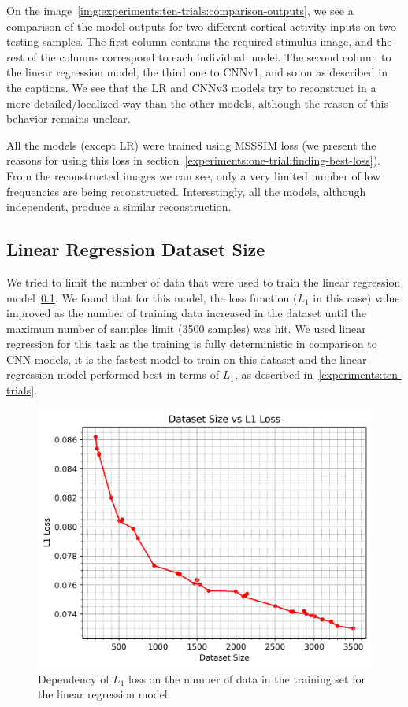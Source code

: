 On the image~\ref{img:experiments:ten-trials:comparison-outputs}, we see a comparison of the model outputs for two different cortical activity inputs on two testing samples. The first column contains the required stimulus image, and the rest of the columns correspond to each individual model. The second column to the linear regression model, the third one to CNNv1, and so on as described in the captions. We see that the LR and CNNv3 models try to reconstruct in a more detailed/localized way than the other models, although the reason of this behavior remains unclear.

All the models (except LR) were trained using MSSSIM loss (we present the reasons for using this loss in section~\ref{experiments:one-trial:finding-best-loss}). From the reconstructed images we can see, only a very limited number of low frequencies are being reconstructed. Interestingly, all the models, although independent, produce a similar reconstruction.


\subsection{Linear Regression Dataset Size}
\label{experiments:ten-trials:linear-regression}
We tried to limit the number of data that were used to train the linear regression model~\ref{experiments:ten-trials:linear-regression}. We found that for this model, the loss function ($L_1$ in this case) value improved as the number of training data increased in the dataset until the maximum number of samples limit (3500 samples) was hit. We used linear regression for this task as the training is fully deterministic in comparison to CNN models, it is the fastest model to train on this dataset and the linear regression model performed best in terms of $L_1$, as described in~\ref{experiments:ten-trials}.

\begin{figure}[H]\centering
\includegraphics[width=140mm]{img/ten-trials/linear_regression_ten_trials.png}
\caption{Dependency of $L_1$ loss on the number of data in the training set for the linear regression model.}
\label{img:experiments:ten-trials:linear-regression}
\end{figure}

